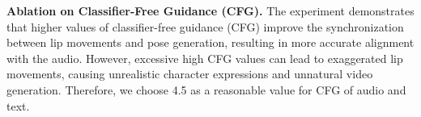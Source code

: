 \noindent\textbf{Ablation on Classifier-Free Guidance (CFG).} The experiment demonstrates that higher values of classifier-free guidance (CFG) improve the synchronization between lip movements and pose generation, resulting in more accurate alignment with the audio. However, excessive high CFG values can lead to exaggerated lip movements, causing unrealistic character expressions and unnatural video generation. Therefore, we choose 4.5 as a reasonable value for CFG of audio and text.